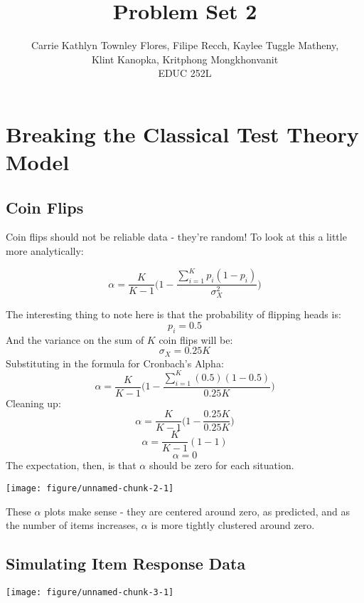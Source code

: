 \documentclass{article}\usepackage[]{graphicx}\usepackage[]{color}
\title{Problem Set 2}
\author{Carrie Kathlyn Townley Flores, Filipe Recch, Kaylee Tuggle Matheny, \\ Klint Kanopka, Kritphong Mongkhonvanit \\ EDUC 252L}
\makeatletter
\def\maxwidth{ %
  \ifdim\Gin@nat@width>\linewidth
    \linewidth
  \else
    \Gin@nat@width
  \fi
}
\newenvironment{knitrout}{}{} %
\makeatother
\begin{document}
\maketitle
\section{Breaking the Classical Test Theory Model}

  \subsection{Coin Flips}
    Coin flips should not be reliable data - they're random!  To look at this a little more analytically:
    
      \[ \alpha = \frac{K}{K-1}\Bigg(1-\frac{\sum_{i=1}^{K}p_i(1-p_i)}{\sigma_{X}^{2}}\Bigg)\]
    
    The interesting thing to note here is that the probability of flipping heads is:
      \[p_i = 0.5 \]
    And the variance on the sum of $K$ coin flips will be:
      \[ \sigma_X = 0.25K \]
    Substituting in the formula for Cronbach's Alpha:
      \[ \alpha = \frac{K}{K-1}\Bigg(1-\frac{\sum_{i=1}^{K}(0.5)(1-0.5)}{0.25K}\Bigg)\]
    Cleaning up:
      \[ \alpha = \frac{K}{K-1}\Bigg(1-\frac{0.25K}{0.25K}\Bigg)\]
      \[ \alpha = \frac{K}{K-1}(1-1)\]
      \[ \alpha = 0 \]
    The expectation, then, is that $\alpha$ should be zero for each situation.


\begin{knitrout}
\color{fgcolor}
\texttt{[image: figure/unnamed-chunk-2-1]} 

\end{knitrout}

    These $\alpha$ plots make sense - they are centered around zero, as predicted, and as the number of items increases, $\alpha$ is more tightly clustered around zero.

  \subsection{Simulating Item Response Data}

\begin{knitrout}
\color{fgcolor}
\texttt{[image: figure/unnamed-chunk-3-1]} 

\end{knitrout}
\end{document}
